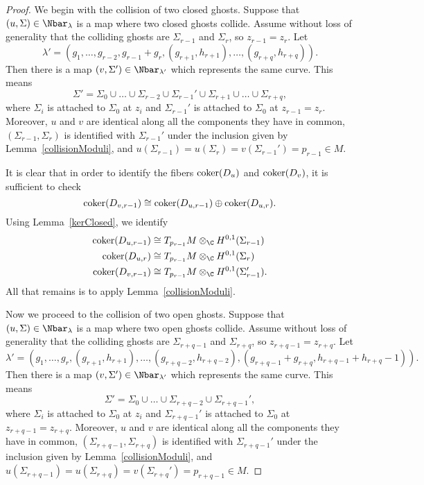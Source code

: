 \begin{proposition}
\begin{proof}
We begin with the collision of two closed ghosts. Suppose that $(u,\Sigma) \in \Nbar_\lambda$ is a map where two closed ghosts collide. Assume without loss of generality that the colliding ghosts are $\Sigma_{r-1}$ and $\Sigma_r$, so $z_{r-1}=z_r$. Let
\[
\lambda' = (g_1,\ldots,g_{r-2},g_{r-1}+g_r,(g_{r+1},h_{r+1}),\ldots,(g_{r+q},h_{r+q})).
\]
Then there is a map $(v,\Sigma') \in \Nbar_{\lambda'}$ which represents the same curve. This means 
\[
\Sigma' = \Sigma_0 \cup \ldots \cup \Sigma_{r-2} \cup \Sigma_{r-1}' \cup \Sigma_{r+1} \cup \ldots \cup \Sigma_{r+q},
\]
where $\Sigma_i$ is attached to $\Sigma_0$ at $z_i$ and $\Sigma_{r-1}'$ is attached to $\Sigma_0$ at $z_{r-1}=z_r$. Moreover, $u$ and $v$ are identical along all the components they have in common, $(\Sigma_{r-1},\Sigma_r)$ is identified with $\Sigma_{r-1}'$ under the inclusion given by Lemma~\ref{collisionModuli}, and $u(\Sigma_{r-1})=u(\Sigma_r)=v(\Sigma_{r-1}')=p_{r-1} \in M$.

It is clear that in order to identify the fibers $\operatorname{coker}(D_u)$ and $\operatorname{coker}(D_v)$, it is sufficient to check
\[
\operatorname{coker}(D_{v,r-1}) \cong \operatorname{coker}(D_{u,r-1}) \oplus \operatorname{coker}(D_{u,r}).
\]
Using Lemma~\ref{kerClosed}, we identify 
\begin{align*}
\coker(D_{u,r-1}) & \cong T_{p_{r-1}}M \otimes_\C H^{0,1}(\Sigma_{r-1})
\\
\coker(D_{u,r}) & \cong T_{p_{r-1}}M \otimes_\C H^{0,1}(\Sigma_r)
\\
\coker(D_{v,r-1}) & \cong T_{p_{r-1}}M \otimes_\C H^{0,1}(\Sigma_{r-1}').
\end{align*}
All that remains is to apply Lemma~\ref{collisionModuli}.

Now we proceed to the collision of two open ghosts. Suppose that $(u,\Sigma) \in \Nbar_\lambda$ is a map where two open ghosts collide. Assume without loss of generality that the colliding ghosts are $\Sigma_{r+q-1}$ and $\Sigma_{r+q}$, so $z_{r+q-1}=z_{r+q}$. Let
\[
\lambda' = (g_1,\ldots,g_r,(g_{r+1},h_{r+1}),\ldots,(g_{r+q-2},h_{r+q-2}),(g_{r+q-1}+g_{r+q},h_{r+q-1}+h_{r+q}-1)).
\]
Then there is a map $(v,\Sigma') \in \Nbar_{\lambda'}$ which represents the same curve. This means 
\[
\Sigma' = \Sigma_0 \cup \ldots \cup \Sigma_{r+q-2} \cup \Sigma_{r+q-1}',
\]
where $\Sigma_i$ is attached to $\Sigma_0$ at $z_i$ and $\Sigma_{r+q-1}'$ is attached to $\Sigma_0$ at $z_{r+q-1}=z_{r+q}$. Moreover, $u$ and $v$ are identical along all the components they have in common, $(\Sigma_{r+q-1},\Sigma_{r+q})$ is identified with $\Sigma_{r+q-1}'$ under the inclusion given by Lemma~\ref{collisionModuli}, and $u(\Sigma_{r+q-1})=u(\Sigma_{r+q})=v(\Sigma_{r+q}')=p_{r+q-1} \in M$.


\end{proof}
\end{proposition}
